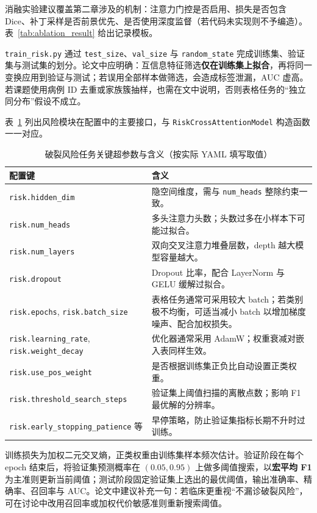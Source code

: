 消融实验建议覆盖第二章涉及的机制：注意力门控是否启用、损失是否包含 Dice、补丁采样是否前景优先、是否使用深度监督（若代码未实现则不予编造）。表~\ref{tab:ablation_result} 给出记录模板。

\texttt{train\_risk.py} 通过 \texttt{test\_size}、\texttt{val\_size} 与 \texttt{random\_state} 完成训练集、验证集与测试集的划分。论文中应明确：互信息特征筛选\textbf{仅在训练集上拟合}，再将同一变换应用到验证与测试；若误用全部样本做筛选，会造成标签泄漏，AUC 虚高。若课题使用病例 ID 去重或家族簇抽样，也需在文中说明，否则表格任务的“独立同分布”假设不成立。

表~\ref{tab:risk_hyper} 列出风险模块在配置中的主要接口，与 \texttt{RiskCrossAttentionModel} 构造函数一一对应。

\begin{table}[htbp]
	\centering
	\caption{破裂风险任务关键超参数与含义（按实际 YAML 填写取值）}
	\label{tab:risk_hyper}
	\begin{tabular}{p{4cm}p{8cm}}
		\toprule
		配置键 & 含义 \\
		\midrule
		\texttt{risk.hidden\_dim} & 隐空间维度，需与 \texttt{num\_heads} 整除约束一致。 \\
		\texttt{risk.num\_heads} & 多头注意力头数；头数过多在小样本下可能过拟合。 \\
		\texttt{risk.num\_layers} & 双向交叉注意力堆叠层数，depth 越大模型容量越大。 \\
		\texttt{risk.dropout} & Dropout 比率，配合 LayerNorm 与 GELU 缓解过拟合。 \\
		\texttt{risk.epochs}, \texttt{risk.batch\_size} & 表格任务通常可采用较大 batch；若类别极不均衡，可适当减小 batch 以增加梯度噪声、配合加权损失。 \\
		\texttt{risk.learning\_rate}, \texttt{risk.weight\_decay} & 优化器通常采用 AdamW；权重衰减对嵌入表同样生效。 \\
		\texttt{risk.use\_pos\_weight} & 是否根据训练集正负比自动设置正类权重。 \\
		\texttt{risk.threshold\_search\_steps} & 验证集上阈值扫描的离散点数；影响 F1 最优解的分辨率。 \\
		\texttt{risk.early\_stopping\_patience} 等 & 早停策略，防止验证集指标长期不升时过训练。 \\
		\bottomrule
	\end{tabular}
\end{table}

训练损失为加权二元交叉熵，正类权重由训练集样本频次估计。验证阶段在每个 epoch 结束后，将验证集预测概率在 $(0.05,0.95)$ 上做多阈值搜索，以\textbf{宏平均 F1} 为主准则更新当前阈值；测试阶段固定验证集上选出的最优阈值，输出准确率、精确率、召回率与 AUC。论文中建议补充一句：若临床更重视“不漏诊破裂风险”，可在讨论中改用召回率或加权代价敏感准则重新搜索阈值。

